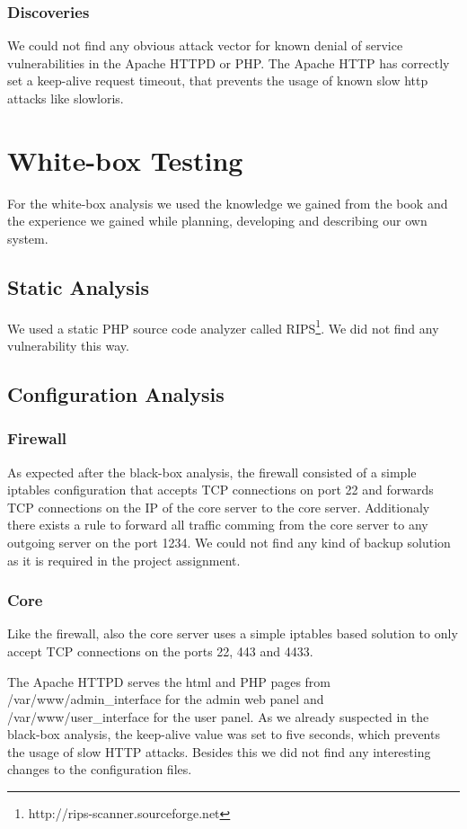 \documentclass{article}
\begin{document}
\subsubsection*{Discoveries}
We could not find any obvious attack vector for known denial of service vulnerabilities in the Apache HTTPD or PHP. The Apache HTTP has correctly set a keep-alive request timeout, that prevents the usage of known slow http attacks like slowloris.

\section{White-box Testing}
For the white-box analysis we used the knowledge we gained from the book and the experience we gained while planning, developing and describing our own system.

\subsection{Static Analysis}
We used a static PHP source code analyzer called RIPS\footnote{http://rips-scanner.sourceforge.net}. We did not find any vulnerability this way.

\subsection{Configuration Analysis}
\subsubsection*{Firewall}
As expected after the black-box analysis, the firewall consisted of a simple iptables configuration that accepts TCP connections on port 22 and forwards TCP connections on the IP of the core server to the core server. Additionaly there exists a rule to forward all traffic comming from the core server to any outgoing server on the port 1234.
We could not find any kind of backup solution as it is required in the project assignment.

\subsubsection*{Core}
Like the firewall, also the core server uses a simple iptables based solution to only accept TCP connections on the ports 22, 443 and 4433.

The Apache HTTPD serves the html and PHP pages from /var/www/admin\_interface for the admin web panel and /var/www/user\_interface for the user panel. As we already suspected in the black-box analysis, the keep-alive value was set to five seconds, which prevents the usage of slow HTTP attacks. Besides this we did not find any interesting changes to the configuration files.
\end{document}
